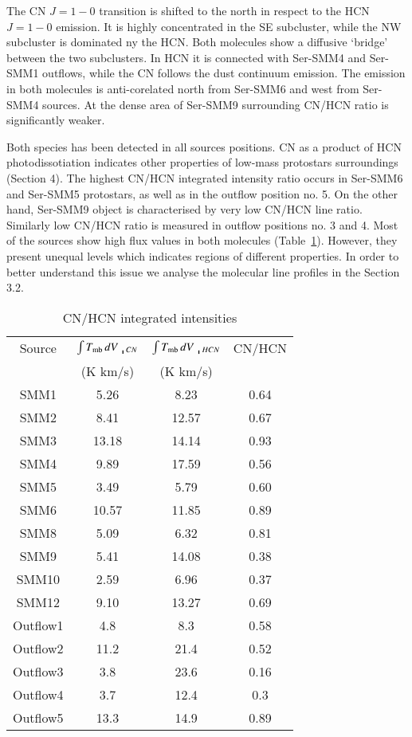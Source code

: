 \documentclass{aa}
\begin{document}
The CN $J=1-0$ transition is shifted to the north in respect to the HCN $J=1-0$ emission. It is highly concentrated in the SE subcluster, while the NW subcluster is dominated ny the HCN. Both molecules show a diffusive ‘bridge’ between the two subclusters. In HCN it is connected with Ser-SMM4 and Ser-SMM1 outflows, while the CN follows the dust continuum emission.  The emission in both molecules is anti-corelated north from Ser-SMM6 and west from Ser-SMM4 sources. At the dense area of Ser-SMM9 surrounding CN/HCN ratio is significantly weaker. 

Both species has been detected in all sources positions. CN as a product of HCN photodissotiation indicates other properties of low-mass protostars surroundings (Section 4). The highest CN/HCN integrated intensity ratio occurs in Ser-SMM6 and Ser-SMM5 protostars, as well as in the outflow position no. 5. On the other hand, Ser-SMM9 object is characterised by very low CN/HCN line ratio. Similarly low CN/HCN ratio is measured in outflow positions no. 3 and 4. Most of the sources show high flux values in both molecules (Table~\ref{table:CN/HCN}). However, they present unequal levels which indicates regions of different properties. In order to better understand this issue we analyse the molecular line profiles in the Section 3.2.


\begin{table}
\caption{CN/HCN integrated intensities}             %
\label{table:CN/HCN}      %
\centering                          %
\begin{tabular}{c c c c} 
\hline\hline  
Source & $\int T_\mathrm{mb}\, dV \, \bracevert_{CN}$ &  $\int T_\mathrm{mb}\, dV \, \bracevert_{HCN}$ & CN/HCN \\
& (K km/s) & (K km/s) & \\
\hline
SMM1 & 5.26 & 8.23 & 0.64 \\
SMM2 & 8.41 & 12.57 & 0.67 \\
SMM3 & 13.18 & 14.14 & 0.93 \\ 
SMM4 & 9.89 & 17.59 & 0.56\\
SMM5 & 3.49 & 5.79 & 0.60 \\
SMM6 & 10.57 & 11.85 & 0.89 \\ 
SMM8 & 5.09 & 6.32 & 0.81 \\
SMM9 & 5.41 & 14.08 & 0.38 \\
SMM10 & 2.59 & 6.96 & 0.37\\ 
SMM12 & 9.10 & 13.27 & 0.69 \\ \hdashline
Outflow1 & 4.8 & 8.3 & 0.58 \\
Outflow2 & 11.2 & 21.4 & 0.52 \\
Outflow3 & 3.8 & 23.6 & 0.16 \\
Outflow4 & 3.7 & 12.4 & 0.3 \\
Outflow5 & 13.3 & 14.9 & 0.89 \\
\hline
\end{tabular}
\end{table} 
\end{document}
